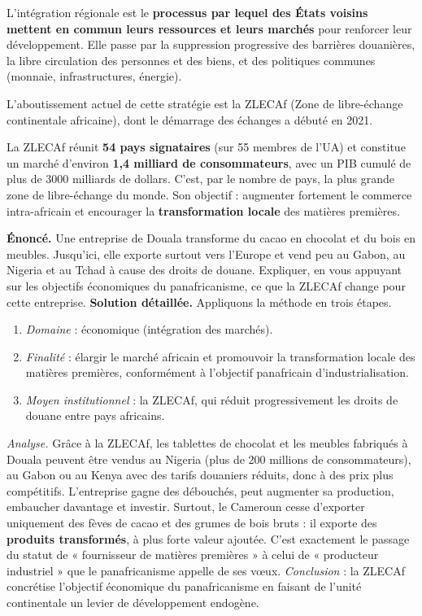 \documentclass[11pt]{article}
\newcommand{\cle}[1]{{\popxbold\color{popdark}#1}}
\begin{document}
\begin{definition}
L'\cle{intégration régionale} est le \textbf{processus par lequel des États voisins mettent en commun leurs ressources et leurs marchés} pour renforcer leur développement. Elle passe par la suppression progressive des barrières douanières, la libre circulation des personnes et des biens, et des politiques communes (monnaie, infrastructures, énergie).
\end{definition}

L'aboutissement actuel de cette stratégie est la \cle{ZLECAf} (Zone de libre-échange continentale africaine), dont le démarrage des échanges a débuté en 2021.

\begin{exemplebox}
La ZLECAf réunit \textbf{54 pays signataires} (sur 55 membres de l'UA) et constitue un marché d'environ \textbf{1,4 milliard de consommateurs}, avec un PIB cumulé de plus de \num{3000} milliards de dollars. C'est, par le nombre de pays, la plus grande zone de libre-échange du monde. Son objectif : augmenter fortement le commerce intra-africain et encourager la \textbf{transformation locale} des matières premières.
\end{exemplebox}

\begin{exoresolu}
\textbf{Énoncé.} Une entreprise de Douala transforme du cacao en chocolat et du bois en meubles. Jusqu'ici, elle exporte surtout vers l'Europe et vend peu au Gabon, au Nigeria et au Tchad à cause des droits de douane. Expliquer, en vous appuyant sur les objectifs économiques du panafricanisme, ce que la ZLECAf change pour cette entreprise.
\tcblower
\textbf{Solution détaillée.} Appliquons la méthode en trois étapes.
\begin{enumerate}
\item \emph{Domaine} : économique (intégration des marchés).
\item \emph{Finalité} : élargir le marché africain et promouvoir la transformation locale des matières premières, conformément à l'objectif panafricain d'industrialisation.
\item \emph{Moyen institutionnel} : la ZLECAf, qui réduit progressivement les droits de douane entre pays africains.
\end{enumerate}
\emph{Analyse.} Grâce à la ZLECAf, les tablettes de chocolat et les meubles fabriqués à Douala peuvent être vendus au Nigeria (plus de 200 millions de consommateurs), au Gabon ou au Kenya avec des tarifs douaniers réduits, donc à des prix plus compétitifs. L'entreprise gagne des débouchés, peut augmenter sa production, embaucher davantage et investir. Surtout, le Cameroun cesse d'exporter uniquement des fèves de cacao et des grumes de bois bruts : il exporte des \textbf{produits transformés}, à plus forte valeur ajoutée. C'est exactement le passage du statut de « fournisseur de matières premières » à celui de « producteur industriel » que le panafricanisme appelle de ses vœux. \emph{Conclusion} : la ZLECAf concrétise l'objectif économique du panafricanisme en faisant de l'unité continentale un levier de développement endogène.
\end{exoresolu}
\end{document}
